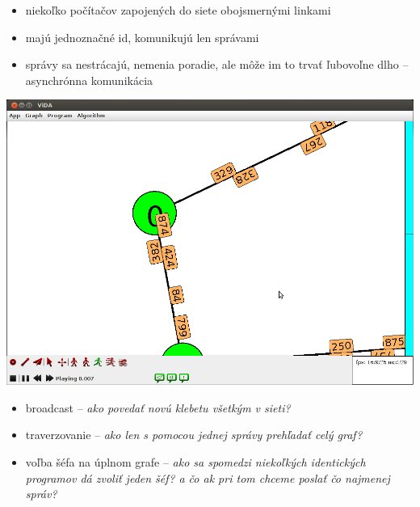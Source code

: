 
\begin{itemize}
    \item niekoľko počítačov zapojených do siete obojsmernými linkami
    \item majú jednoznačné id, komunikujú len správami
    \item správy sa nestrácajú, nemenia poradie, ale môže im to trvať ľubovoľne dlho -- asynchrónna
    komunikácia

\end{itemize}

\includegraphics[width=\columnwidth]{spravy}


\begin{itemize}

    \item broadcast -- \textit{ako povedať novú klebetu všetkým v sieti?}
    \item traverzovanie -- \textit{ako len s pomocou jednej správy prehľadať celý graf?}
    \item voľba šéfa na úplnom grafe -- \textit{ako sa spomedzi niekoľkých identických programov
    dá zvoliť jeden šéf? a čo ak pri tom chceme poslať čo najmenej správ?}

\end{itemize}
    




